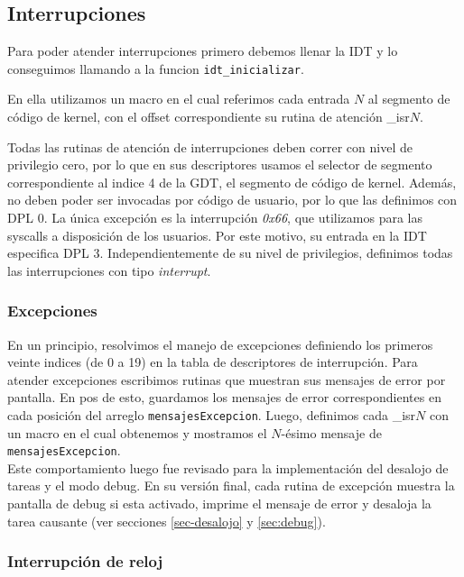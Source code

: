\subsection{Interrupciones}

Para poder atender interrupciones primero debemos llenar la IDT y lo conseguimos llamando a la funcion \verb|idt_inicializar|. 

En ella utilizamos un macro en el cual referimos cada entrada $N$ al segmento de código de kernel, con el offset correspondiente su rutina de atención \_isr$N$. 

Todas las rutinas de atención de interrupciones deben correr con nivel de privilegio cero, por lo que en sus descriptores usamos el selector de segmento correspondiente al indice 4 de la GDT, el segmento de código de kernel.
Además, no deben poder ser invocadas por código de usuario, por lo que las definimos con DPL 0. La única excepción es la interrupción \textit{0x66}, que utilizamos para las syscalls a disposición de los usuarios. Por este motivo, su entrada en la IDT especifica DPL 3.
Independientemente de su nivel de privilegios, definimos todas las interrupciones con tipo \textit{interrupt}.



\subsubsection{Excepciones}

En un principio, resolvimos el manejo de excepciones definiendo los primeros veinte indices (de 0 a 19) en la tabla de descriptores de interrupción. 
Para atender excepciones escribimos rutinas que muestran sus mensajes de error por pantalla.
En pos de esto, guardamos los mensajes de error correspondientes en cada posición del arreglo \verb|mensajesExcepcion|.
Luego, definimos cada \_isr$N$ con un macro en el cual obtenemos y mostramos el $N$-ésimo mensaje de \verb|mensajesExcepcion|.\\

Este comportamiento luego fue revisado para la implementación del desalojo de tareas y el modo debug. En su versión final, cada rutina de excepción muestra la pantalla de debug si esta activado, imprime el mensaje de error y desaloja la tarea causante (ver secciones \ref{sec-desalojo} y \ref{sec:debug}).


\subsubsection{Interrupción de reloj}

